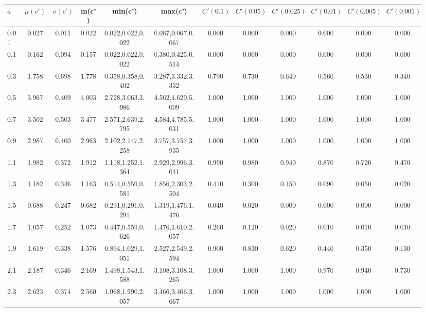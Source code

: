 \begin{table*}[h]
\begin{center}
\begin{tabular}{| l | c | c | c | c | c | c | c | c | c | c | c |}\hline
$a$ & $\mu(c')$ & $\sigma(c')$ & m(c') & min(c') & max(c') & $\overline{C'(0.1)}$ & $\overline{C'(0.05)}$ & $\overline{C'(0.025)}$ & $\overline{C'(0.01)}$ & $\overline{C'(0.005)}$ & $\overline{C'(0.001)}$ \\\hline
0.01 & 0.027 & 0.011 & 0.022 & 0.022,0.022,0.022 & 0.067,0.067,0.067  & 0.000  & 0.000  & 0.000  & 0.000  & 0.000  & 0.000 \\\hline
0.1 & 0.162 & 0.094 & 0.157 & 0.022,0.022,0.022 & 0.380,0.425,0.514  & 0.000  & 0.000  & 0.000  & 0.000  & 0.000  & 0.000 \\\hline
0.3 & 1.758 & 0.698 & 1.778 & 0.358,0.358,0.402 & 3.287,3.332,3.332  & 0.790  & 0.730  & 0.640  & 0.560  & 0.530  & 0.340 \\\hline
0.5 & 3.967 & 0.409 & 4.003 & 2.728,3.063,3.086 & 4.562,4.629,5.009  & 1.000  & 1.000  & 1.000  & 1.000  & 1.000  & 1.000 \\\hline
0.7 & 3.502 & 0.503 & 3.477 & 2.571,2.639,2.795 & 4.584,4.785,5.031  & 1.000  & 1.000  & 1.000  & 1.000  & 1.000  & 1.000 \\\hline
0.9 & 2.987 & 0.400 & 2.963 & 2.102,2.147,2.258 & 3.757,3.757,3.935  & 1.000  & 1.000  & 1.000  & 1.000  & 1.000  & 1.000 \\\hline
1.1 & 1.982 & 0.372 & 1.912 & 1.118,1.252,1.364 & 2.929,2.996,3.041  & 0.990  & 0.980  & 0.940  & 0.870  & 0.720  & 0.470 \\\hline
1.3 & 1.182 & 0.346 & 1.163 & 0.514,0.559,0.581 & 1.856,2.303,2.504  & 0.410  & 0.300  & 0.150  & 0.090  & 0.050  & 0.020 \\\hline
1.5 & 0.688 & 0.247 & 0.682 & 0.291,0.291,0.291 & 1.319,1.476,1.476  & 0.040  & 0.020  & 0.000  & 0.000  & 0.000  & 0.000 \\\hline
1.7 & 1.057 & 0.252 & 1.073 & 0.447,0.559,0.626 & 1.476,1.610,2.057  & 0.260  & 0.120  & 0.020  & 0.010  & 0.010  & 0.010 \\\hline
1.9 & 1.619 & 0.338 & 1.576 & 0.894,1.029,1.051 & 2.527,2.549,2.594  & 0.900  & 0.830  & 0.620  & 0.440  & 0.350  & 0.130 \\\hline
2.1 & 2.187 & 0.346 & 2.169 & 1.498,1.543,1.588 & 3.108,3.108,3.265  & 1.000  & 1.000  & 1.000  & 0.970  & 0.940  & 0.730 \\\hline
2.3 & 2.623 & 0.374 & 2.560 & 1.968,1.990,2.057 & 3.466,3.466,3.667  & 1.000  & 1.000  & 1.000  & 1.000  & 1.000  & 1.000 \\\hline

\end{tabular}
\end{center}
\end{table*}
